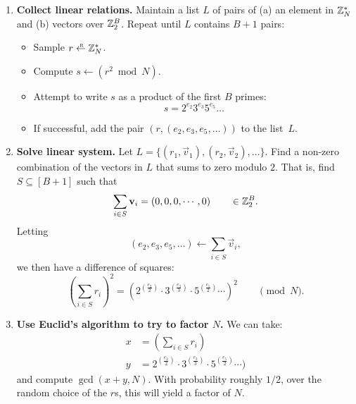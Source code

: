 \begin{enumerate}
\item \textbf{Collect linear relations.}
      Maintain a list $L$ of pairs of 
      (a) an element in $\mathbb{Z}^*_N$ and (b) vectors over $\mathbb{Z}_2^B$.
      Repeat until $L$ contains $B+1$ pairs:
      \begin{itemize}
          \item Sample $r \getsr \Z^*_N$.
          \item Compute $s \gets (r^2 \bmod N)$.
          \item Attempt to write $s$ as a product of the first $B$ primes:
            \[ s = 2^{e_2} 3^{e_3} 5^{e_5} \dots \]
          \item If successful, add the pair $(r, (e_2, e_3, e_5, \dots))$
                to the list~$L$.

          
      \end{itemize}

\item \textbf{Solve linear system.}
        Let $L = \{ (r_1, \vec v_1), (r_2, \vec v_2), \dots \}$.
        Find a non-zero combination of the vectors in $L$
        that sums to zero modulo $2$.
        That is, find $S \subseteq [B+1]$ such that
\[ \sum_{i \in S} \mathbf{v}_i = (0, 0, 0, \cdots, 0) \qquad \in \mathbb{Z}_2^B. \]
Letting 
\[ (e_2, e_3, e_5, \dots) \gets \sum_{i \in S} \vec v_i,\]
        we then have a difference of squares:
    \[ \left(\sum_{i \in S} r_i \right)^2 = (2^{(\frac{e_2}{2})} \cdot 3^{(\frac{e_3}{3})} \cdot 5^{(\frac{e_5}{2})} \cdots )^2 \qquad \pmod N.\]

  \item \textbf{Use Euclid's algorithm to try to factor $N$.}
    We can take:
\begin{align*}
  x &= \left(\sum_{i \in S} r_i \right)\\
  y&= 2^{(\frac{e_2}{2})} \cdot 3^{(\frac{e_3}{3})} \cdot 5^{(\frac{e_5}{2})} \cdots )
\end{align*}
     and compute $\gcd(x+y, N)$.
     With probability roughly $1/2$, over the random choice of the $r$s, this will
     yield a factor of $N$.
\end{enumerate}

